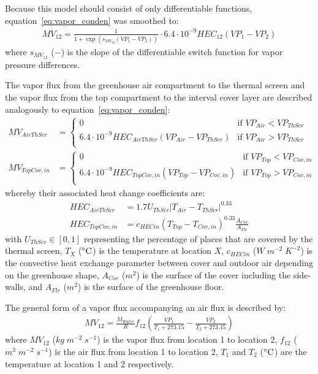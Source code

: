 \documentclass[a4paper]{article}
\begin{document}
Because this model should consist of only differentiable functions, equation~\eqref{eq:vapor_conden} was smoothed to:
\begin{align}
  MV_{12} = \frac{1}{1 + \exp \left(s_{MV_{12}} (VP_1 - VP_2)\right)} \cdot 6.4 \cdot 10^{-9} HEC_{12} (VP_1 - VP_2)
\end{align}
where \(s_{MV_{12}}\) (\(-\)) is the slope of the differentiable switch function for vapor pressure differences.

The vapor flux from the greenhouse air compartment to the thermal screen and the vapor flux from the top compartment to the interval cover layer are described analogously to equation~\eqref{eq:vapor_conden}:
\begin{align}
  MV_{AirThScr}  & = \begin{cases}
    0                                                       & \text{if~} VP_{Air} < VP_{ThScr} \\
    6.4 \cdot 10^{-9} HEC_{AirThScr}(VP_{Air} - VP_{ThScr}) & \text{if~} VP_{Air} > VP_{ThScr} \\
  \end{cases} \\
  MV_{TopCov,in} & = \begin{cases}
    0                                                         & \text{if~} VP_{Top} < VP_{Cov,in} \\
    6.4 \cdot 10^{-9} HEC_{TopCov,in}(VP_{Top} - VP_{Cov,in}) & \text{if~} VP_{Top} > VP_{Cov,in} \\
  \end{cases}
\end{align}
whereby their associated heat change coefficients are:
\begin{align}
  HEC_{AirThScr}  & = 1.7 U_{ThScr} |T_{Air} - T_{ThScr}|^{0.33}                        \\
  HEC_{TopCov,in} & = {c_{HECin} (T_{Top} - T_{Cov,in})}^{0.33} \frac{A_{Cov}}{A_{Flr}}
\end{align}
with \(U_{ThScr} \in [0,1]\) representing the percentage of places that are covered by the thermal screen, \(T_X\) (\(\celsius\)) is the temperature at location \(X\), \(c_{HECin}\) (\(W\;m^{-2}\;K^{-2}\)) is the convective heat exchange parameter between cover and outdoor air depending on the greenhouse shape, \(A_{Cov}\) (\(m^2\)) is the surface of the cover including the side-walls, and \(A_{Flr}\) (\(m^2\)) is the surface of the greenhouse floor.

The general form of a vapor flux accompanying an air flux is described by:
\begin{align}
  \label{eq:vapor_air}
  MV_{12} = \frac{M_{Water}}{R} f_{12} \left(\frac{VP_1}{T_1 + 273.15} - \frac{VP_2}{T_2 + 273.15}\right)
\end{align}
where \(MV_{12}\) (\(kg\;m^{-2}\;s^{-1}\)) is the vapor flux from location 1 to location 2, \(f_{12}\) (\(m^3\;m^{-2}\;s^{-1}\)) is the air flux from location 1 to location 2, \(T_1\) and \(T_2\) (\(\celsius\)) are the temperature at location 1 and 2 respectively.
\end{document}
